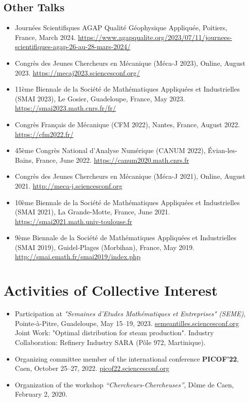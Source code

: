 \documentclass[10pt]{article}
\begin{document}
\subsection{Other Talks}
\begin{itemize}
\item Journées Scientifiques AGAP Qualité Géophysique Appliquée, Poitiers, France, March 2024. \url{https://www.agapqualite.org/2023/07/11/journees-scientifiques-agap-26-au-28-mars-2024/}
\item Congrès des Jeunes Chercheurs en Mécanique (Méca-J 2023), Online, August 2023. \url{https://mecaj2023.sciencesconf.org/}
\item 11ème Biennale de la Société de Mathématiques Appliquées et Industrielles (SMAI 2023), Le Gosier, Guadeloupe, France, May 2023. \url{https://smai2023.math.cnrs.fr/fr/}
\item Congrès Français de Mécanique (CFM 2022), Nantes, France, August 2022. \url{https://cfm2022.fr/}
\item 45ème Congrès National d'Analyse Numérique (CANUM 2022), Évian-les-Bains, France, June 2022. \url{https://canum2020.math.cnrs.fr}
\item Congrès des Jeunes Chercheurs en Mécanique (Méca-J 2021), Online, August 2021. \url{http://meca-j.sciencesconf.org}
\item 10ème Biennale de la Société de Mathématiques Appliquées et Industrielles (SMAI 2021), La Grande-Motte, France, June 2021. \url{https://smai2021.math.univ-toulouse.fr}
\item 9ème Biennale de la Société de Mathématiques Appliquées et Industrielles (SMAI 2019), Guidel-Plages (Morbihan), France, May 2019. \url{http://smai.emath.fr/smai2019/index.php}
\end{itemize}


\section{Activities of Collective Interest}

\begin{itemize}
  \item Participation at \textit{"Semaines d'Etudes Mathématiques et Entreprises" (SEME)},  
  Pointe-à-Pitre, Guadeloupe, May 15–19, 2023.  
  \href{https://semeantilles.sciencesconf.org/}{semeantilles.sciencesconf.org}  
  Joint Work: "Optimal distribution for steam production".
  Industry Collaboration: Refinery Industry SARA (Pôle 972, Martinique).

  \item Organizing committee member of the international conference \textbf{PICOF’22},  
  Caen, October 25–27, 2022.  
  \href{https://picof22.sciencesconf.org/}{picof22.sciencesconf.org}

  \item Organization of the workshop \textit{“Chercheurs-Chercheuses”},  
  Dôme de Caen, February 2, 2020.
\end{itemize}
\end{document}
